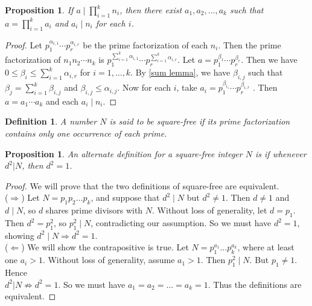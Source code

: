 \documentclass[12pt]{report}
\theoremstyle{newthm}
\newtheorem{Proposition}[lem]{Proposition}
\newtheorem{Definition}[lem]{Definition}
\newtheorem{prop}[lem]{Proposition}
\begin{document}
\begin{Proposition}\label{div prod}
If $a\mid\prod\limits_{i=1}^k n_i$, then there exist $a_1,a_2,\dotsc, a_k$ such that $a=\prod\limits_{i=1}^k a_i$ and $a_i\mid n_i$ for each $i$.
\end{Proposition}

\begin{proof}
Let $p_1^{\alpha_{i,1}}\dotsi p_r^{\alpha_{i,r}}$ be the prime factorization of each $n_i$. Then the prime factorization of $n_1n_2\dotsi n_k$ is $p_1^{\sum_{i=1}^k \alpha_{i,1}}\dotsi p_r^{\sum_{i=1}^k \alpha_{i,r}}$. Let $a=p_1^{\beta_1}\dotsi p_r^{\beta_r}$. Then we have $0\leq \beta_i\leq \sum\limits_{i=1}^k \alpha_{i,r}$ for $i=1,\dotsc, k$. By \cref{sum lemma}, we have $\beta_{i,j}$ such that $\beta_j=\sum\limits_{i=1}^k \beta_{i,j}$ and $\beta_{i,j}\leq \alpha_{i,j}$. Now for each $i$, take $a_i =  p_1^{\beta_{i_1}}\dotsi p_r^{\beta_{i,r}}$ . Then $a=a_1\dotsi a_k$ and each $a_i\mid n_i$.
\end{proof}

\begin{Definition} A number $N$ is said to be \textit{square-free} if its prime factorization contains only one occurrence of each prime.  
\end{Definition}

\begin{prop}\label{sq-alt}
An alternate definition for a square-free integer $N$ is if whenever $d^2|N$, then $d^2=1$. 
\end{prop}
\begin{proof}
We will prove that the two definitions of square-free are equivalent. \\
($\Rightarrow$) Let $N=p_1p_2\dotsc p_k$, and suppose that $d^2\mid N$ but $d^2\neq1$. Then $d\neq 1$ and $d\mid N$, so $d$ shares prime divisors with $N$. Without loss of generality, let $d=p_1$. Then $d^2=p_1^2$, so $p_1^2\mid N$, contradicting our assumption. So we must have $d^2=1$, showing $d^2\mid N \Rightarrow d^2=1$. \\
($\Leftarrow$) We will show the contrapositive is true. Let $N=p_1^{a_1}\dots p_k^{a_k}$, where at least one $a_i>1$. Without loss of generality, assume $a_1>1$. Then $p_1^2\mid N$. But $p_1\neq 1$. Hence \\$d^2|N\not\Rightarrow d^2=1$. So we must have $a_1=a_2=\dotsc = a_k =1.$ Thus the definitions are equivalent. 
\end{proof}
\end{document}
